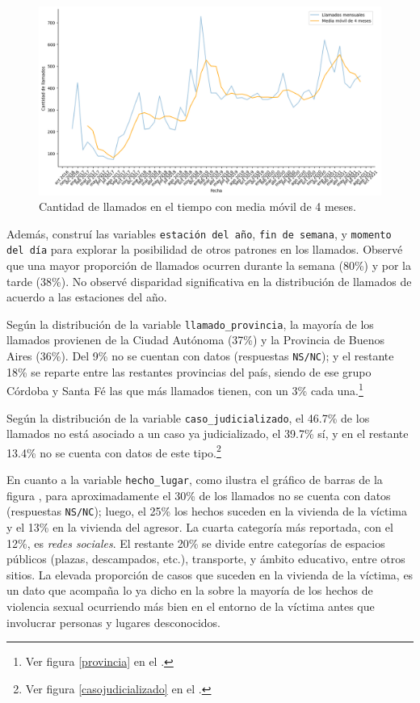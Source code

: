 \documentclass[10 pt]{article}
\begin{document}
\begin{figure}[H]
    \begin{center}
    \includegraphics[scale=.5]{images/latex_trend_llamados.png}
    \caption{Cantidad de llamados en el tiempo con media móvil de 4 meses.}
    \label{trend}
    \end{center}
    \end{figure}

Además, construí las variables \texttt{estación del año}, \texttt{fin de semana}, y \texttt{momento del día} para explorar la posibilidad de otros patrones en los llamados. Observé que una mayor proporción de llamados ocurren durante la semana (80\%) y por la tarde (38\%). No observé disparidad significativa en la distribución de llamados de acuerdo a las estaciones del año.


Según la distribución de la variable \texttt{llamado\_provincia}, la mayoría de los llamados provienen de la Ciudad Autónoma (37\%) y la Provincia de Buenos Aires (36\%). Del 9\% no se cuentan con datos (respuestas \texttt{NS/NC}); y el restante 18\% se reparte entre las restantes provincias del país, siendo de ese grupo Córdoba y Santa Fé las que más llamados tienen, con un 3\% cada una.\footnote{Ver figura \ref{provincia} en el .}

Según la distribución de la variable \texttt{caso\_judicializado}, el 46.7\% de los llamados no está asociado a un caso ya judicializado, el 39.7\% sí, y en el restante 13.4\% no se cuenta con datos de este tipo.\footnote{Ver figura \ref{casojudicializado} en el .} 

En cuanto a la variable \texttt{hecho\_lugar}, como ilustra el gráfico de barras de la figura , para aproximadamente el 30\% de los llamados no se cuenta con datos (respuestas \texttt{NS/NC}); luego, el 25\% los hechos suceden en la vivienda de la víctima y el 13\% en la vivienda del agresor. La cuarta categoría más reportada, con el 12\%, es \textit{redes sociales}. El restante 20\% se divide entre categorías de espacios públicos (plazas, descampados, etc.), transporte, y ámbito educativo, entre otros sitios. La elevada proporción de casos que suceden en la vivienda de la víctima, es un dato que acompaña lo ya dicho en la  sobre la mayoría de los hechos de violencia sexual ocurriendo más bien en el entorno de la víctima antes que involucrar personas y lugares desconocidos. 
\end{document}
